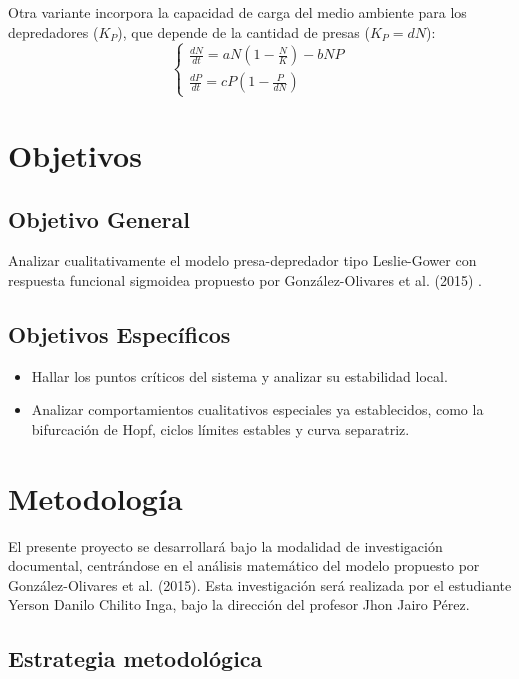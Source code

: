 \documentclass[12pt,letterpaper,oneside]{book}
\theoremstyle{definition}
\theoremstyle{remark}
\begin{document}
		Otra variante incorpora la capacidad de carga del medio ambiente para los depredadores ($K_P$), que depende de la cantidad de presas ($K_P = dN$):
		\begin{equation}
			\begin{cases} 
				\frac{dN}{dt} = aN\left(1 - \frac{N}{K}\right) - bNP \\
				\frac{dP}{dt} = cP(1-\frac{P}{dN})
			\end{cases}
		\end{equation}
	
	\chapter{Objetivos}
	
	\section{Objetivo General}
	
	Analizar cualitativamente el modelo presa-depredador tipo Leslie-Gower con respuesta funcional sigmoidea propuesto por González-Olivares et al. (2015) \cite{articulo}.
	
	\section{Objetivos Específicos}
	
	\begin{itemize}
		\item Hallar los puntos críticos del sistema y analizar su estabilidad local.
		\item Analizar comportamientos cualitativos especiales ya establecidos, como la bifurcación de Hopf, ciclos límites estables y curva separatriz.
	\end{itemize}
	
	\chapter{Metodología}
	
	El presente proyecto se desarrollará bajo la modalidad de investigación documental, centrándose en el análisis matemático del modelo propuesto por González-Olivares et al. (2015). Esta investigación será realizada por el estudiante Yerson Danilo Chilito Inga, bajo la dirección del profesor Jhon Jairo Pérez.
	
	\section{Estrategia metodológica}
	
\end{document}
